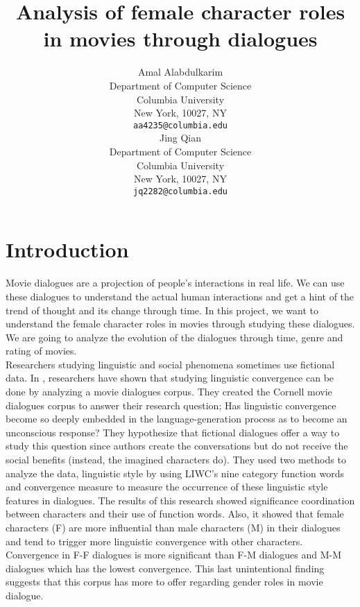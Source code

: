 \documentclass[11pt,a4paper]{article}
\title{Analysis of female character roles in movies through dialogues
}
\author{Amal Alabdulkarim \\
  Department of Computer Science \\
  Columbia University \\
  New York, 10027, NY \\
  {\tt aa4235@columbia.edu} \\\And
  Jing Qian \\
  Department of Computer Science \\
  Columbia University \\
   New York, 10027, NY \\
  {\tt jq2282@columbia.edu} \\}
\date{}
\begin{document}
\maketitle
\section{Introduction}
Movie dialogues are a projection of people’s interactions in real life. We can use these dialogues to understand the actual human interactions and get a hint of the trend of thought and its change through time. In this project, we want to understand the female character roles in movies through studying these dialogues. We are going to analyze the evolution of the dialogues through time, genre and rating of movies.\\

Researchers studying linguistic and social phenomena sometimes use fictional data. In \cite{Danescu-Niculescu-Mizil2011ChameleonsDialogs}, researchers have shown that studying linguistic convergence can be done by analyzing a movie dialogues corpus. They created the Cornell movie dialogues corpus to answer their research question; Has linguistic convergence become so deeply embedded in the language-generation process as to become an unconscious response? They hypothesize that fictional dialogues offer a way to study this question since authors create the conversations but do not receive the social benefits (instead, the imagined characters do). They used two methods to analyze the data, linguistic style by using LIWC’s nine category function words and convergence measure to measure the occurrence of these linguistic style features in dialogues. The results of this research showed significance coordination between characters and their use of function words. Also, it showed that female characters (F) are more influential than male characters (M) in their dialogues and tend to trigger more linguistic convergence with other characters. Convergence in F-F dialogues is more significant than F-M dialogues and M-M dialogues which has the lowest convergence. This last unintentional finding suggests that this corpus has more to offer regarding gender roles in movie dialogue. \\
\end{document}
